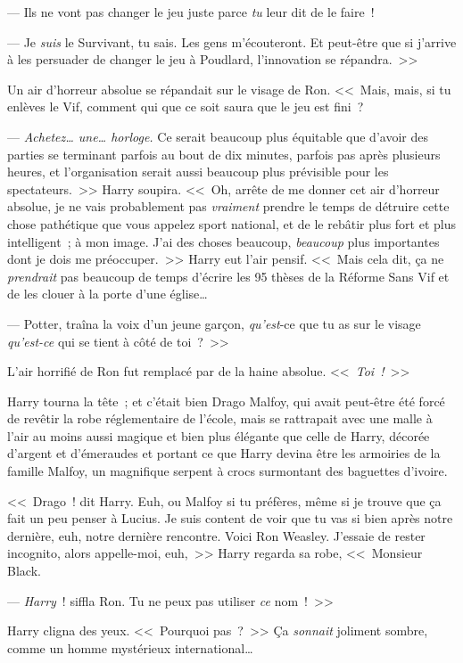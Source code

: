 --- Ils ne vont pas changer le jeu juste parce \emph{tu} leur dit de le faire~!

--- Je \emph{suis} le Survivant, tu sais. Les gens m'écouteront. Et peut-être que si j'arrive à les persuader de changer le jeu à Poudlard, l'innovation se répandra.~>>

Un air d'horreur absolue se répandait sur le visage de Ron.
<<~Mais, mais, si tu enlèves le Vif, comment qui que ce soit saura que le jeu est fini~?

--- \emph{Achetez… une… horloge.} Ce serait beaucoup plus équitable que d'avoir des parties se terminant parfois au bout de dix minutes, parfois pas après plusieurs heures, et l'organisation serait aussi beaucoup plus prévisible pour les spectateurs.~>> Harry soupira. <<~Oh, arrête de me donner cet air d'horreur absolue, je ne vais probablement pas \emph{vraiment} prendre le temps de détruire cette chose pathétique que vous appelez sport national, et de le rebâtir plus fort et plus intelligent~; à mon image. J'ai des choses beaucoup, \emph{beaucoup} plus importantes dont je dois me préoccuper.~>> Harry eut l'air pensif. <<~Mais cela dit, ça ne \emph{prendrait} pas beaucoup de temps d'écrire les 95 thèses de la Réforme Sans Vif et de les clouer à la porte d'une église…

--- Potter, traîna la voix d'un jeune garçon, \emph{qu'est}-ce que tu as sur le visage \emph{qu'est-ce} qui se tient à côté de toi~?~>>

L'air horrifié de Ron fut remplacé par de la haine absolue. <<~\emph{Toi~!}~>>

Harry tourna la tête~; et c'était bien Drago Malfoy, qui avait peut-être été forcé de revêtir la robe réglementaire de l'école, mais se rattrapait avec une malle à l'air au moins aussi magique et bien plus élégante que celle de Harry, décorée d'argent et d'émeraudes et portant ce que Harry devina être les armoiries de la famille Malfoy, un magnifique serpent à crocs surmontant des baguettes d'ivoire.

<<~Drago~! dit Harry. Euh, ou Malfoy si tu préfères, même si je trouve que ça fait un peu penser à Lucius. Je suis content de voir que tu vas si bien après notre dernière, euh, notre dernière rencontre. Voici Ron Weasley. J'essaie de rester incognito, alors appelle-moi, euh,~>> Harry regarda sa robe, <<~Monsieur Black.

--- \emph{Harry}~! siffla Ron. Tu ne peux pas utiliser \emph{ce} nom~!~>>

Harry cligna des yeux. <<~Pourquoi pas~?~>> Ça \emph{sonnait} joliment sombre, comme un homme mystérieux international…

